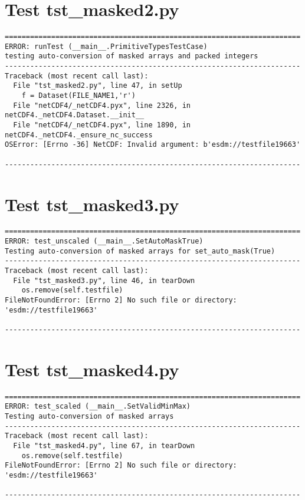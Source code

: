 \section{Test tst\_masked2.py}

\begin{verbatim}
======================================================================
ERROR: runTest (__main__.PrimitiveTypesTestCase)
testing auto-conversion of masked arrays and packed integers
----------------------------------------------------------------------
Traceback (most recent call last):
  File "tst_masked2.py", line 47, in setUp
    f = Dataset(FILE_NAME1,'r')
  File "netCDF4/_netCDF4.pyx", line 2326, in netCDF4._netCDF4.Dataset.__init__
  File "netCDF4/_netCDF4.pyx", line 1890, in netCDF4._netCDF4._ensure_nc_success
OSError: [Errno -36] NetCDF: Invalid argument: b'esdm://testfile19663'

----------------------------------------------------------------------
\end{verbatim}

\section{Test tst\_masked3.py}

\begin{verbatim}
======================================================================
ERROR: test_unscaled (__main__.SetAutoMaskTrue)
Testing auto-conversion of masked arrays for set_auto_mask(True)
----------------------------------------------------------------------
Traceback (most recent call last):
  File "tst_masked3.py", line 46, in tearDown
    os.remove(self.testfile)
FileNotFoundError: [Errno 2] No such file or directory: 'esdm://testfile19663'

----------------------------------------------------------------------
\end{verbatim}

\section{Test tst\_masked4.py}

\begin{verbatim}
======================================================================
ERROR: test_scaled (__main__.SetValidMinMax)
Testing auto-conversion of masked arrays
----------------------------------------------------------------------
Traceback (most recent call last):
  File "tst_masked4.py", line 67, in tearDown
    os.remove(self.testfile)
FileNotFoundError: [Errno 2] No such file or directory: 'esdm://testfile19663'

----------------------------------------------------------------------
\end{verbatim}

